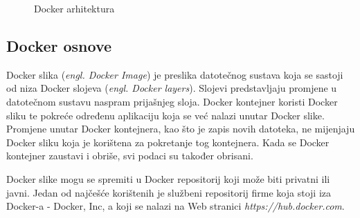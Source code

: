 \begin{figure}[h]
    \centering

    \caption{Docker arhitektura}%
    \label{fig:02docker}
\end{figure}

\subsection{Docker osnove}
Docker slika (\textit{engl. Docker Image}) je preslika datotečnog sustava koja se sastoji od niza
Docker slojeva (\textit{engl. Docker layers}). Slojevi predstavljaju promjene u datotečnom sustavu
naspram prijašnjeg sloja. Docker kontejner koristi Docker sliku te pokreće određenu aplikaciju koja
se već nalazi unutar Docker slike. Promjene unutar Docker kontejnera, kao što je zapis novih
datoteka, ne mijenjaju Docker sliku koja je korištena za pokretanje tog kontejnera. Kada se Docker
kontejner zaustavi i obriše, svi podaci su također obrisani.

Docker slike mogu se spremiti u Docker repositorij koji može biti privatni ili javni. Jedan od
najčešće korištenih je službeni repositorij firme koja stoji iza Docker-a - Docker, Inc, a koji se
nalazi na Web stranici \textit{https://hub.docker.com}. 


